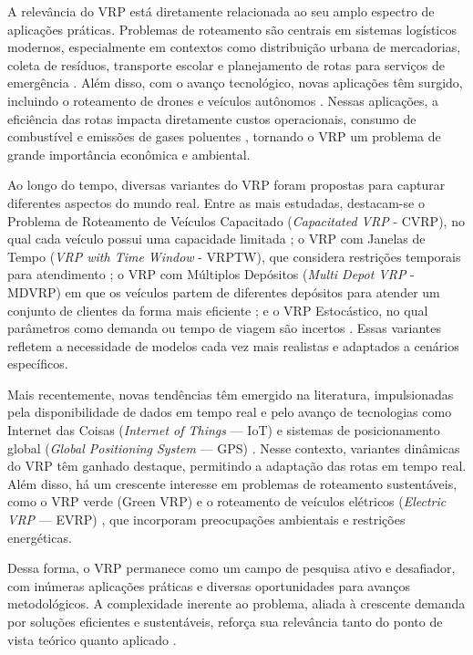 A relevância do VRP está diretamente relacionada ao seu amplo espectro de aplicações práticas. Problemas de roteamento são centrais em sistemas logísticos modernos, especialmente em contextos como distribuição urbana de mercadorias, coleta de resíduos, transporte escolar e planejamento de rotas para serviços de emergência \cite{golden2008vehicle,toth2002vehicle}. Além disso, com o avanço tecnológico, novas aplicações têm surgido, incluindo o roteamento de drones e veículos autônomos \cite{otto2018optimization}. Nessas aplicações, a eficiência das rotas impacta diretamente custos operacionais, consumo de combustível e emissões de gases poluentes \cite{lin2014survey}, tornando o VRP um problema de grande importância econômica e ambiental.

Ao longo do tempo, diversas variantes do VRP foram propostas para capturar diferentes aspectos do mundo real. Entre as mais estudadas, destacam-se o Problema de Roteamento de Veículos Capacitado (\textit{Capacitated VRP} - CVRP), no qual cada veículo possui uma capacidade limitada  \cite{solomon1987algorithms, xiao2012development}; o VRP com Janelas de Tempo (\textit{VRP with Time Window} - VRPTW), que considera restrições temporais para atendimento \cite{christofides1979vehicle, gambardella1999macs}; o VRP com Múltiplos Depósitos (\textit{Multi Depot VRP} - MDVRP) em que os veículos partem de diferentes depósitos para atender um conjunto de clientes da forma mais eficiente \cite{alinaghian2018multi}; e o VRP Estocástico, no qual parâmetros como demanda ou tempo de viagem são incertos \cite{renaud1996tabu, gendreau1996stochastic}. Essas variantes refletem a necessidade de modelos cada vez mais realistas e adaptados a cenários específicos.

Mais recentemente, novas tendências têm emergido na literatura, impulsionadas pela disponibilidade de dados em tempo real e pelo avanço de tecnologias como Internet das Coisas (\textit{Internet of Things} --- IoT) e sistemas de posicionamento global (\textit{Global Positioning System} --- GPS) \cite{ritzinger2016survey, boysen2018scheduling}. Nesse contexto, variantes dinâmicas do VRP têm ganhado destaque, permitindo a adaptação das rotas em tempo real. Além disso, há um crescente interesse em problemas de roteamento sustentáveis, como o VRP verde (Green VRP) \cite{lin2014survey} e o roteamento de veículos elétricos (\textit{Electric VRP} --- EVRP) \cite{schiffer2017electric}, que incorporam preocupações ambientais e restrições energéticas.

Dessa forma, o VRP permanece como um campo de pesquisa ativo e desafiador, com inúmeras aplicações práticas e diversas oportunidades para avanços metodológicos. A complexidade inerente ao problema, aliada à crescente demanda por soluções eficientes e sustentáveis, reforça sua relevância tanto do ponto de vista teórico quanto aplicado \cite{braekers2016vehicle, moghdani2021green}.

